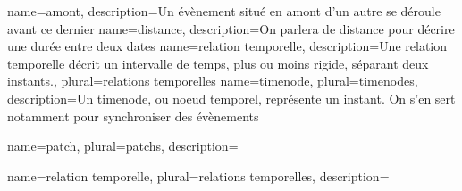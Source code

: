 {
    name=amont,
    description={Un évènement situé en amont d'un autre se déroule avant ce dernier}
}
{
    name=distance,
    description={On parlera de distance pour décrire une durée entre deux dates}
}
{
  name={relation temporelle},
  description={Une relation temporelle décrit un intervalle de temps, plus ou moins rigide, séparant deux instants.},
  plural={relations temporelles}
}
{
  name={timenode},
  plural={timenodes},
  description={Un timenode, ou noeud temporel, représente un instant. On s'en sert notamment pour synchroniser des évènements}
}

{
  name={patch},
  plural={patchs},
  description={}%
}

{
  name={relation temporelle},
  plural={relations temporelles},
  description={}%
}








